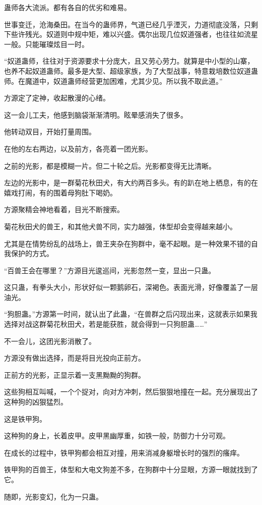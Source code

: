 \begin{this_body}
蛊师各大流派。都有各自的优劣和难易。

世事变迁，沧海桑田。在当今的蛊师界，气道已经几乎湮灭，力道彻底没落，只剩下些许残光。奴道则中规中矩，难以兴盛。偶尔出现几位奴道强者，也往往如流星一般。只能璀璨炫目一时。

“奴道蛊师，往往对于资源要求十分庞大，且又劳心劳力。就算是中小型的山寨，也养不起奴道蛊师。最多是大型、超级家族，为了大型战事，特意栽培数位奴道蛊师。在魔道中，奴道蛊师经营更加困难，尤其少见。所以我不取此道。”

方源定了定神，收起散漫的心绪。

这一会儿工夫，他感到脑袋渐渐清明。眩晕感消失了很多。

他转动双目，开始打量周围。

在他的左右两边，以及前方，各亮着一团光影。

之前的光影，都是模糊一片。但二十轮之后。光影都变得无比清晰。

左边的光影中，是一群菊花秋田犬，有大约两百多头。有的趴在地上栖息，有的在嬉戏打闹，有的围着母狗肚下喝奶。

方源聚精会神地看着，目光不断搜索。

菊花秋田犬的兽王，和其他犬兽不同，实力越强，体型却会变得越来越小。

尤其是在情势纷乱的战场上，兽王夹杂在狗群中，毫不起眼。是一种效果不错的自我保护的方式。

“百兽王会在哪里？”方源目光逡巡间，光影忽然一变，显出一只蛊。

这只蛊，有拳头大小，形状好似一颗鹅卵石，深褐色。表面光滑，好像覆盖了一层油光。

“狗胆蛊。”方源第一时间，就认出了此蛊，“在兽群之后闪现出来，这就表示如果我选择对战这群菊花秋田犬，若是能获胜，就会得到一只狗胆蛊……”

不一会儿，这团光影消散了。

方源没有做出选择，而是将目光投向正前方。

正前方的光影，正显示着一支黑黝黝的狗群。

这些狗相互叫喊，一个个捉对，向对方冲刺，然后狠狠地撞在一起。充分展现出了这种狗的凶狠猛烈。

这是铁甲狗。

这种狗的身上，长着皮甲。皮甲黑幽厚重，如铁一般，防御力十分可观。

在成长的过程中，铁甲狗都会相互对撞，用来消减身躯增长时的强烈的瘙痒。

铁甲狗的百兽王，体型和大电文狗差不多，在狗群中十分显眼，方源一眼就找到了它。

随即，光影变幻，化为一只蛊。


\end{this_body}
